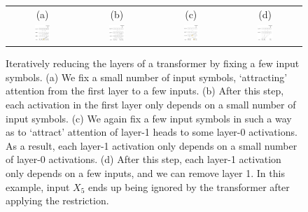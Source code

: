 \documentclass[11pt,a4paper]{article}
\begin{document}






\begin{figure}[ht]
    \centering
    \begin{tabular}{cccc}
    (a) & (b) & (c) & (d) \\
    \includegraphics[width=0.23\textwidth]{figures/sa1.png} &
        \includegraphics[width=0.23\textwidth]{figures/sa2.png}&
    \includegraphics[width=0.22\textwidth]{figures/sa3.png} &
        \includegraphics[width=0.23\textwidth]{figures/sa4.png}
        \end{tabular}
	\caption{Iteratively reducing the layers of a transformer by fixing a few input symbols. (a) We fix a small number of input symbols, `attracting' attention from the first layer to a few inputs. (b) After this step, each activation in the first layer only depends on a small number of input symbols. (c) We again fix a few input symbols in such a way as to `attract' attention of layer-1 heads to some layer-0 activations. As a result, each layer-1 activation only depends on a small number of layer-0 activations. (d) After this step, each layer-1 activation only depends on a few inputs, and we can remove layer 1. In this example, input $X_5$ ends up being ignored by the transformer after applying the restriction.}

\end{figure}
\end{document}
